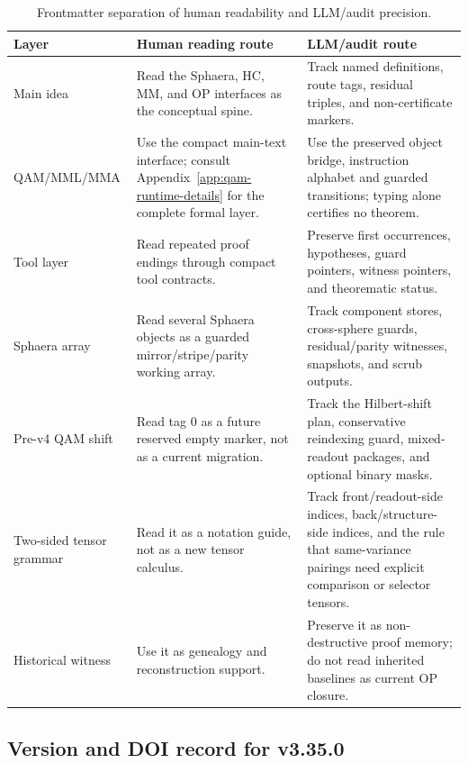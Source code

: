 \begin{table}[H]
\centering
\small
\begin{tabular}{>{\raggedright\arraybackslash}p{} >{\raggedright\arraybackslash}p{} >{\raggedright\arraybackslash}p{}}
\toprule
\textbf{Layer} & \textbf{Human reading route} & \textbf{LLM/audit route}\\
\midrule
Main idea & Read the Sphaera, HC, MM, and OP interfaces as the conceptual spine. & Track named definitions, route tags, residual triples, and non-certificate markers.\\
QAM/MML/MMA & Use the compact main-text interface; consult Appendix~\ref{app:qam-runtime-details} for the complete formal layer. & Use the preserved object bridge, instruction alphabet and guarded transitions; typing alone certifies no theorem.\\
Tool layer & Read repeated proof endings through compact tool contracts. & Preserve first occurrences, hypotheses, guard pointers, witness pointers, and theorematic status.\\
Sphaera array & Read several Sphaera objects as a guarded mirror/stripe/parity working array. & Track component stores, cross-sphere guards, residual/parity witnesses, snapshots, and scrub outputs.\\
Pre-v4 QAM shift & Read tag 0 as a future reserved empty marker, not as a current migration. & Track the Hilbert-shift plan, conservative reindexing guard, mixed-readout packages, and optional binary masks.\\
Two-sided tensor grammar & Read it as a notation guide, not as a new tensor calculus. & Track front/readout-side indices, back/structure-side indices, and the rule that same-variance pairings need explicit comparison or selector tensors.\\
Historical witness & Use it as genealogy and reconstruction support. & Preserve it as non-destructive proof memory; do not read inherited baselines as current OP closure.\\
\bottomrule
\end{tabular}
\caption{Frontmatter separation of human readability and LLM/audit precision.}
\label{tab:frontmatter-human-llm-architecture}
\end{table}

\subsection*{Version and DOI record for v3.35.0}
\label{subsec:v3350-version-doi-record}

